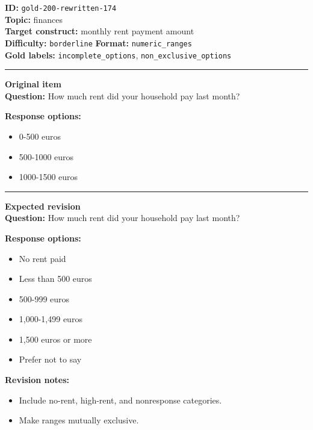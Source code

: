 \documentclass[10pt,a4paper]{article}
\newcommand{\sectionline}{\vspace{0.15em}\hrule\vspace{0.35em}}
\begin{document}
\begin{tcolorbox}[colframe=FlawRed,colback=white,colbacktitle=FlawRed!9,coltitle=black,title={Item 174\hfill Flawed item}]
\textbf{ID:} \texttt{gold-200-rewritten-174}\\
\textbf{Topic:} finances\\
\textbf{Target construct:} monthly rent payment amount\\
\textbf{Difficulty:} \texttt{borderline} \quad \textbf{Format:} \texttt{numeric\_ranges}\\
\textbf{Gold labels:} \texttt{incomplete\_options}, \texttt{non\_exclusive\_options}\\
\sectionline
\textbf{Original item}\\
\textbf{Question:} How much rent did your household pay last month?
\par\textbf{Response options:}
\begin{itemize}
\item 0-500 euros
\item 500-1000 euros
\item 1000-1500 euros
\end{itemize}
\sectionline
\textbf{Expected revision}\\
\textbf{Question:} How much rent did your household pay last month?
\par\textbf{Response options:}
\begin{itemize}
\item No rent paid
\item Less than 500 euros
\item 500-999 euros
\item 1,000-1,499 euros
\item 1,500 euros or more
\item Prefer not to say
\end{itemize}
\par\textbf{Revision notes:}
\begin{itemize}
\item Include no-rent, high-rent, and nonresponse categories.
\item Make ranges mutually exclusive.
\end{itemize}
\end{tcolorbox}
\end{document}
